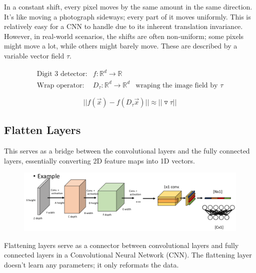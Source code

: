 \documentclass[11pt]{article}
\begin{document}
In a constant shift, every pixel moves by the same amount in the same direction. It's like moving a photograph sideways; every part of it moves uniformly. This is relatively easy for a CNN to handle due to its inherent translation invariance. However, in real-world scenarios, the shifts are often non-uniform; some pixels might move a lot, while others might barely move. These are described by a variable vector field $\tau$.

\begin{align*}
    \text{Digit 3 detector:} & f:\mathbb{R}^d \rightarrow \mathbb{R} \\
    \text{Wrap operator:} & D_\tau:\mathbb{R}^d \rightarrow \mathbb{R}^d & \text{wraping the image field by } \tau
\end{align*}

\begin{equation*}
    ||f(\vec{x})-f(D_\tau\vec{x})|| \approx || \triangledown \tau ||
\end{equation*}



\subsection{Flatten Layers}

This serves as a bridge between the convolutional layers and the fully connected layers, essentially converting 2D feature maps into 1D vectors.

\begin{figure}[H]
    \centering
    \includegraphics[width=\linewidth]{figures/flattening.png}
\end{figure}

Flattening layers serve as a connector between convolutional layers and fully connected layers in a Convolutional Neural Network (CNN). The flattening layer doesn't learn any parameters; it only reformats the data.
\end{document}
